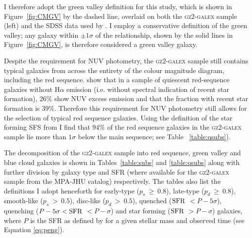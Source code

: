 I therefore adopt the \citet{Baldry04} green valley definition for this study, which is shown in Figure~\ref{fig:CMGV} by the dashed line, overlaid on both the \textsc{gz2-galex} sample (left) and the SDSS data used by \citet[][right]{Baldry04}. I employ a conservative definition of the green valley; any galaxy within $\pm 1\sigma$ of the \citeauthor{Baldry04} relationship, shown by the solid lines in Figure~\ref{fig:CMGV}, is therefore considered a green valley galaxy. 

Despite the requirement for NUV photometry, the \textsc{gz2-galex} sample still contains typical galaxies from across the entirety of the colour magnitude diagram, including the red sequence. \cite{ko13} show that in a sample of quiescent red-sequence galaxies without $\mathrm{H}\alpha$ emission (i.e. without spectral indication of recent star formation), $26\%$ show NUV excess emission and that the fraction with recent star formation is $39\%$. Therefore this requirement for NUV photometry still allows for the selection of typical red sequence galaxies. Using the definition of the star forming SFS from \citet[][see Section~\ref{qmod}]{peng10} I find that $94\%$ of the red sequence galaxies in the \textsc{gz2-galex} sample lie more than $1\sigma$ below the main sequence; see Table ~\ref{table:qsubs}). 

The decomposition of the \textsc{gz2-galex} sample into red sequence, green valley and blue cloud galaxies is shown in Tables~\ref{table:subs} and \ref{table:qsubs} along with further division by galaxy type and SFR (where available for the \textsc{gz2-galex} sample from the MPA-JHU catalog) respectively. The tables also list the definitions I adopt henceforth for early-type ($p_s~ \geq~0.8$), late-type ($p_d~ \geq~0.8$), smooth-like ($p_s~ >~0.5$), disc-like ($p_d~ >~0.5$), quenched ($\rm{SFR}$ $ < P - 5\sigma$), quenching ($P - 5\sigma < \rm{SFR}$ $< P - \sigma$) and star forming  ($\rm{SFR}$ $> P -\sigma$) galaxies, where $P$ is the SFR as defined by \citet{peng10} for a given stellar mass and observed time (see Equation \ref{eq:peng}). 

